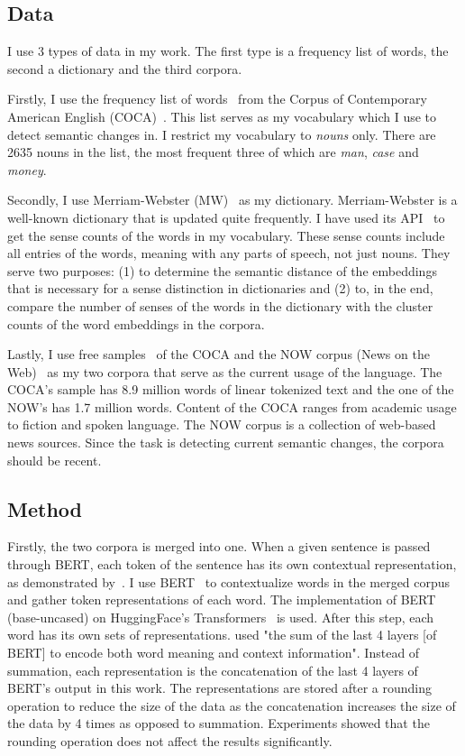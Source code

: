 \documentclass[11pt]{article}
\begin{document}
\subsection{Data}

I use 3 types of data in my work.
The first type is a frequency list of words, the second a dictionary and the third corpora.

Firstly, I use the frequency list of words~\cite{word-freq-2023-coca} from the Corpus of Contemporary American English (COCA)~\cite{english-corpora-2008-coca}.
This list serves as my vocabulary which I use to detect semantic changes in.
I restrict my vocabulary to \textit{nouns} only.
There are 2635 nouns in the list, the most frequent three of which are \textit{man}, \textit{case} and \textit{money}.

Secondly, I use Merriam-Webster (MW)~\cite{mw-2023-dictionary} as my dictionary.
Merriam-Webster is a well-known dictionary that is updated quite frequently.
I have used its API~\cite{mw-2023-api} to get the sense counts of the words in my vocabulary.
These sense counts include all entries of the words, meaning with any parts of speech, not just nouns.
They serve two purposes: (1) to determine the semantic distance of the embeddings that is necessary for a sense distinction in dictionaries and (2) to, in the end, compare the number of senses of the words in the dictionary with the cluster counts of the word embeddings in the corpora.

Lastly, I use free samples~\cite{corpus-data-2023-corpora} of the COCA and the NOW corpus (News on the Web)~\cite{english-corpora-2016-now} as my two corpora that serve as the current usage of the language.
The COCA's sample has 8.9 million words of linear tokenized text and the one of the NOW's has 1.7 million words.
Content of the COCA ranges from academic usage to fiction and spoken language.
The NOW corpus is a collection of web-based news sources.
Since the task is detecting current semantic changes, the corpora should be recent.

\subsection{Method}

Firstly, the two corpora is merged into one.
When a given sentence is passed through BERT, each token of the sentence has its own contextual representation, as demonstrated by~\cite{pasini-etal-2020-clubert}.
I use BERT~\cite{devlin-etal-2019-bert} to contextualize words in the merged corpus and gather token representations of each word.
The implementation of BERT (base-uncased) on HuggingFace's Transformers~\cite{wolf-etal-2020-transformers} is used.
After this step, each word has its own sets of representations.
\cite{zhou-li-2020-temporalteller} used "the sum of the last 4 layers [of BERT] to encode both word meaning and context information".
Instead of summation, each representation is the concatenation of the last 4 layers of BERT's output in this work.
The representations are stored after a rounding operation to reduce the size of the data as the concatenation increases the size of the data by 4 times as opposed to summation.
Experiments showed that the rounding operation does not affect the results significantly.
\end{document}
